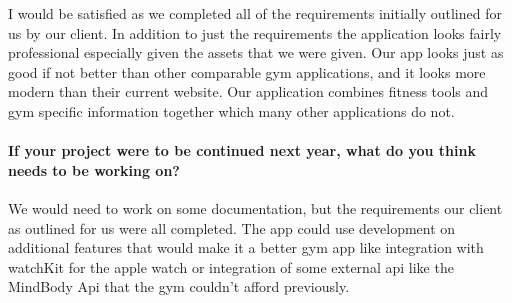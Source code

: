 I would be satisfied as we completed all of the requirements initially
outlined for us by our client. In addition to just the requirements the
application looks fairly professional especially given the assets that
we were given. Our app looks just as good if not better than other
comparable gym applications, and it looks more modern than their current
website. Our application combines fitness tools and gym specific
information together which many other applications do not.

\paragraph{If your project were to be continued next year, what do you
think needs to be working
on?}\label{if-your-project-were-to-be-continued-next-year-what-do-you-think-needs-to-be-working-on}

We would need to work on some documentation, but the requirements our
client as outlined for us were all completed. The app could use
development on additional features that would make it a better gym app
like integration with watchKit for the apple watch or integration of
some external api like the MindBody Api that the gym couldn't afford
previously.
